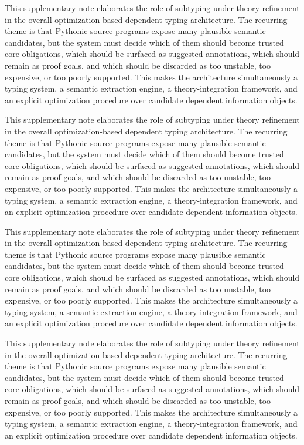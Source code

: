 \documentclass[11pt]{article}
\theoremstyle{definition}
\theoremstyle{plain}
\begin{document}
This supplementary note elaborates the role of subtyping under theory refinement in the overall
optimization-based dependent typing architecture. The recurring theme is that
Pythonic source programs expose many plausible semantic candidates, but the
system must decide which of them should become trusted core obligations, which
should be surfaced as suggested annotations, which should remain as proof
goals, and which should be discarded as too unstable, too expensive, or too
poorly supported. This makes the architecture simultaneously a typing system,
a semantic extraction engine, a theory-integration framework, and an explicit
optimization procedure over candidate dependent information objects.

This supplementary note elaborates the role of subtyping under theory refinement in the overall
optimization-based dependent typing architecture. The recurring theme is that
Pythonic source programs expose many plausible semantic candidates, but the
system must decide which of them should become trusted core obligations, which
should be surfaced as suggested annotations, which should remain as proof
goals, and which should be discarded as too unstable, too expensive, or too
poorly supported. This makes the architecture simultaneously a typing system,
a semantic extraction engine, a theory-integration framework, and an explicit
optimization procedure over candidate dependent information objects.

This supplementary note elaborates the role of subtyping under theory refinement in the overall
optimization-based dependent typing architecture. The recurring theme is that
Pythonic source programs expose many plausible semantic candidates, but the
system must decide which of them should become trusted core obligations, which
should be surfaced as suggested annotations, which should remain as proof
goals, and which should be discarded as too unstable, too expensive, or too
poorly supported. This makes the architecture simultaneously a typing system,
a semantic extraction engine, a theory-integration framework, and an explicit
optimization procedure over candidate dependent information objects.

This supplementary note elaborates the role of subtyping under theory refinement in the overall
optimization-based dependent typing architecture. The recurring theme is that
Pythonic source programs expose many plausible semantic candidates, but the
system must decide which of them should become trusted core obligations, which
should be surfaced as suggested annotations, which should remain as proof
goals, and which should be discarded as too unstable, too expensive, or too
poorly supported. This makes the architecture simultaneously a typing system,
a semantic extraction engine, a theory-integration framework, and an explicit
optimization procedure over candidate dependent information objects.
\end{document}
